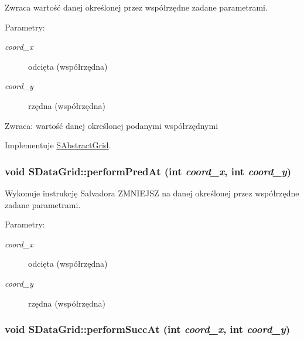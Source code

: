 Zwraca wartość danej określonej przez współrzędne zadane parametrami. \begin{Desc}
\item[Parametry:]
\begin{description}
\item[{\em coord\_\-x}]odcięta (współrzędna) \item[{\em coord\_\-y}]rzędna (współrzędna) \end{description}
\end{Desc}
\begin{Desc}
\item[Zwraca:]wartość danej określonej podanymi współrzędnymi \end{Desc}


Implementuje \hyperlink{classSAbstractGrid_d8772e08d58f970d885775cb9682bf6d}{SAbstractGrid}.\hypertarget{classSDataGrid_7085f1322b3ad39fcbaa9ca13ca79866}{
\subsubsection[{performPredAt}]{\setlength{\rightskip}{0pt plus 5cm}void SDataGrid::performPredAt (int {\em coord\_\-x}, \/  int {\em coord\_\-y})}}
\label{classSDataGrid_7085f1322b3ad39fcbaa9ca13ca79866}


Wykonuje instrukcję Salvadora ZMNIEJSZ na danej określonej przez współrzędne zadane parametrami. \begin{Desc}
\item[Parametry:]
\begin{description}
\item[{\em coord\_\-x}]odcięta (współrzędna) \item[{\em coord\_\-y}]rzędna (współrzędna) \end{description}
\end{Desc}
\hypertarget{classSDataGrid_33bf85628d27e5d467d4aff0b67ccd79}{
\subsubsection[{performSuccAt}]{\setlength{\rightskip}{0pt plus 5cm}void SDataGrid::performSuccAt (int {\em coord\_\-x}, \/  int {\em coord\_\-y})}}
\label{classSDataGrid_33bf85628d27e5d467d4aff0b67ccd79}


